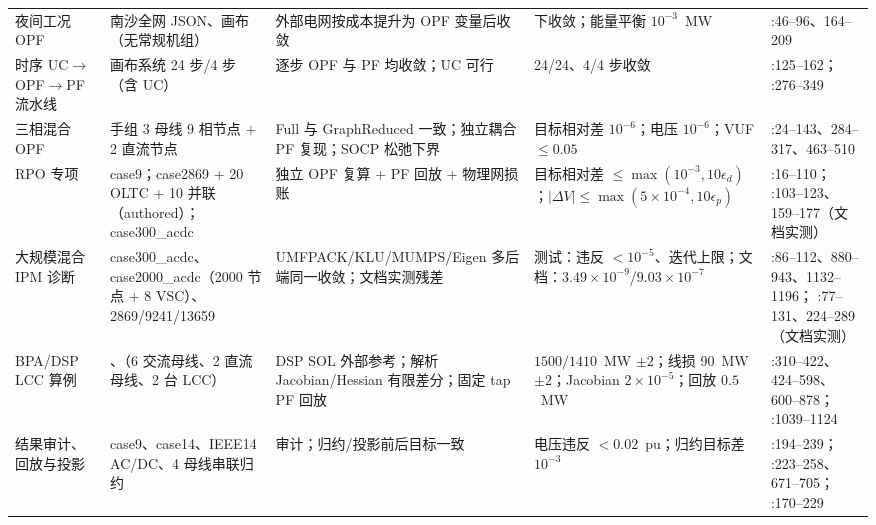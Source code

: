 \begin{footnotesize}
\begin{longtable}{@{}L{2.0cm}L{3.0cm}L{2.9cm}L{3.1cm}L{3.9cm}@{}}
夜间工况 OPF &
南沙全网 JSON、画布 （无常规机组） &
外部电网按成本提升为 OPF 变量后收敛 &
 下收敛；能量平衡 $10^{-3}$~MW &
:46--96、164--209\\
时序 UC$\to$OPF$\to$PF 流水线 &
画布系统 24 步/4 步（含 UC） &
逐步 OPF 与 PF 均收敛；UC 可行 &
24/24、4/4 步收敛 &
:125--162；
:276--349\\
三相混合 OPF &
手组 3 母线 9 相节点 + 2 直流节点 &
Full 与 GraphReduced 一致；独立耦合 PF 复现；SOCP 松弛下界 &
目标相对差 $10^{-6}$；电压 $10^{-6}$；VUF $\le 0.05$ &
:24--143、284--317、463--510\\
RPO 专项 &
case9；case2869 + 20 OLTC + 10 并联（authored）；case300\_acdc &
独立 OPF 复算 + PF 回放 + 物理网损账 &
目标相对差 $\le\max(10^{-3},10\epsilon_d)$；$|\Delta V|\le\max(5\times10^{-4},10\epsilon_p)$ &
:16--110；
:103--123、159--177（文档实测）\\
大规模混合 IPM 诊断 &
case300\_acdc、case2000\_acdc（2000 节点 + 8 VSC）、2869/9241/13659 &
UMFPACK/\allowbreak KLU/\allowbreak MUMPS/\allowbreak Eigen 多后端同一收敛；文档实测残差 &
测试：违反 $<10^{-5}$、迭代上限；文档：$3.49\times10^{-9}$/$9.03\times10^{-7}$ &
:86--112、880--943、1132--1196；
:77--131、224--289（文档实测）\\
BPA/DSP LCC 算例 &
、（6 交流母线、2 直流母线、2 台 LCC） &
DSP SOL 外部参考；解析 Jacobian/Hessian 有限差分；固定 tap PF 回放 &
$1500/1410$~MW $\pm2$；线损 90~MW $\pm2$；Jacobian $2\times10^{-5}$；回放 $0.5$~MW &
:310--422、424--598、600--878；
:1039--1124\\
结果审计、回放与投影 &
case9、case14、IEEE14 AC/DC、4 母线串联归约 &
 审计；归约/投影前后目标一致 &
电压违反 $<0.02$~pu；归约目标差 $10^{-3}$ &
:194--239；
:223--258、671--705；
:170--229\\
\end{longtable}
\end{footnotesize}

